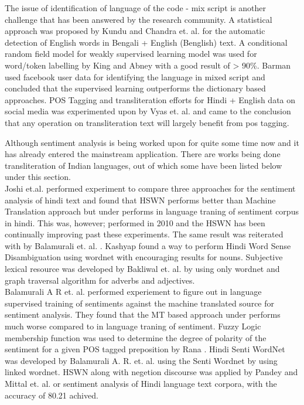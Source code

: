 \documentclass[12pt]{article}
\begin{document}
\fontsize{12}{20}\selectfont The issue of identification of language of the code - mix script is another
challenge that has been answered by the research community. A statistical
approach was proposed by Kundu and Chandra et. al. \cite{kundu_automatic_2012}
for the automatic detection of English words in Bengali + English (Benglish)
text. A conditional random field model for weakly supervised learning model was
used for word/token labelling by King and Abney \cite{king_labeling_2013} with
a good result of > 90\%. Barman \cite{barman_code_2014} used facebook user data
for identifying the language in mixed script and concluded that the supervised
learning outperforms the dictionary based approaches. POS Tagging and
transliteration efforts for Hindi + English data on social media was
experimented upon by Vyas et. al. \cite{vyas_pos_2014} and came to the
conclusion that any operation on transliteration text will largely benefit from
pos tagging. 

\fontsize{12}{20}\selectfont Although sentiment analysis is being worked upon for quite some time now and it
has already entered the mainstream application. There are works being done
transliteration of Indian languages, out of which some have been listed below
under this section.\\

\fontsize{12}{20}\selectfont Joshi et.al. \cite{joshi_fall-back_2010} performed experiment to compare three
approaches for the sentiment analysis of hindi text and found that HSWN
performs better than Machine Translation approach but under performs in
language traning of sentiment corpus in hindi. This was, however; performed in
2010 and the HSWN has been continually improving past these experiments. The
same result was reiterated with by Balamurali et. al.
\cite{hutchison_lost_2013}. Kashyap \cite{kashyap_hindi_????} found a way to
perform Hindi Word Sense Disambiguation using wordnet with encouraging results
for nouns. Subjective lexical resource was developed by Bakliwal et. al.
\cite{bakliwal_hindi_2012} by using only wordnet and graph traversal algorithm
for adverbs and adjectives.\\

\fontsize{12}{20}\selectfont Balamurali A R et. al. \cite{balamurali_a_r_cross-lingual_????} performed
experiement to figure out in language supervised training of sentiments against
the machine translated source for sentiment analysis. They found that the MT
based approach under performs much worse compared to in language traning of
sentiment. Fuzzy Logic membership function was used to determine the degree of
polarity of the sentiment for a given POS tagged preposition by Rana
\cite{shweta_rana_sentiment_2014}. Hindi Senti WordNet was developed by
Balamurali A. R. et. al. \cite{balamurali_a_r_cross-lingual_????} using the Senti Wordnet by using linked wordnet. HSWN along with negetion discourse was applied by Pandey
\cite{pandey_framework_2015} and Mittal et. al. \cite{mittal_sentiment_2013} or
sentiment analysis of Hindi language text corpora, with the accuracy of 80.21
achived. \\
\end{document}
